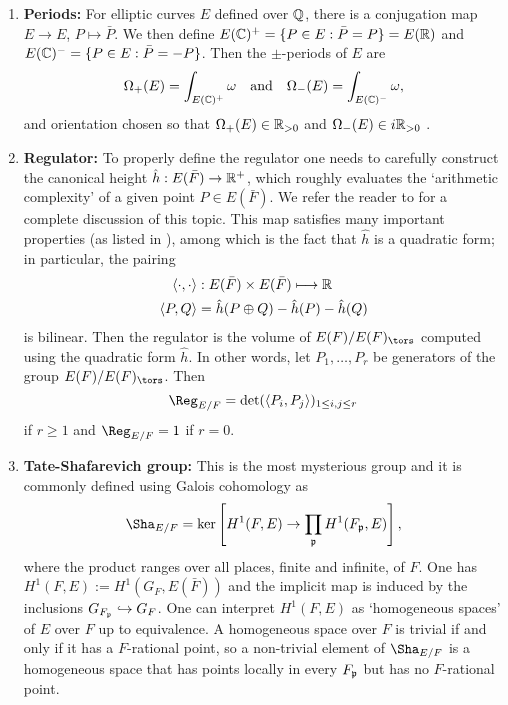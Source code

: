 \begin{enumerate}
    \item \textbf{Periods: } For elliptic curves $E$ defined over $\mathbb{Q}$, there is a conjugation map $E\to E$, $P\mapsto\bar{P}$. We then define $E(\mathbb{C})^+=\{P\in E:\bar{P}=P\}=E(\mathbb{R})$ and $E(\mathbb{C})^-=\{P\in E:\bar{P}=-P\}$. Then the $\pm$-periods of $E$ are 
    $$\Omega_+(E)=\int_{E(\mathbb{C})^+}\omega \quad\text{and}\quad\Omega_-(E)=\int_{E(\mathbb{C})^-}\omega,$$
    and orientation chosen so that $\Omega_+(E)\in\mathbb{R}_{>0}$ and $\Omega_-(E)\in i\mathbb{R}_{>0}$ .
    \item \textbf{Regulator:} To properly define the regulator one needs to carefully construct the canonical height $\hat{h}:E(\bar{F})\rightarrow\mathbb{R}^+$, which roughly evaluates the `arithmetic complexity' of a given point $P\in E(\bar{F})$. We refer the reader to \cite[Chapter VIII: \S4, \S5, \S6 and \S9]{S1} for a complete discussion of this topic. This map satisfies many important properties (as listed in \cite[Chapter VIII, Theorem 9.3]{S1}), among which is the fact that $\hat{h}$ is a quadratic form; in particular, the pairing
    \begin{align*}
        \langle\cdot,\cdot\rangle&:E(\bar{F})\times E(\bar{F})\longmapsto\mathbb{R}\\
        \langle P,Q\rangle&=\hat{h}(P\oplus Q)-\hat{h}(P)-\hat{h}(Q)
    \end{align*}
    is bilinear. Then the regulator is the volume of $E(F)/E(F)_{\tors}$ computed using the quadratic form $\hat{h}$. In other words, let $P_1,\ldots,P_r$ be generators of the group $E(F)/E(F)_{\tors}$. Then $$\Reg_{E/F}=\det(\langle P_i,P_j\rangle)_{1\leq i,j\leq r}$$
    if $r\geq1$ and $\Reg_{E/F}=1$ if $r=0$.
    \item \textbf{Tate-Shafarevich group:} This is the most mysterious group and it is commonly defined using Galois cohomology as
    $$\Sha_{E/F}=\ker\left[H^1(F,E)\rightarrow\prod_{\pp}H^1(F_\pp,E)\right],$$
    where the product ranges over all places, finite and infinite, of $F$. One has $H^1(F,E):=H^1(G_F,E(\bar{F}))$ and the implicit map is induced by the inclusions $G_{F_{\mathfrak{p}}}\hookrightarrow G_F$. One can interpret $H^1(F,E)$ as `homogeneous spaces' of $E$ over $F$ up to equivalence. A homogeneous space over $F$ is trivial if and only if it has a $F$-rational point, so a non-trivial element of $\Sha_{E/F}$ is a homogeneous space that has points locally in every $F_{\mathfrak{p}}$ but has no $F$-rational point.


\end{enumerate}
